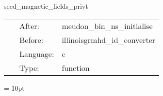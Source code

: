 
\hspace{5mm} seed\_magnetic\_fields\_privt 

\hspace{5mm}{\it set up binary neutron star seed magnetic fields. } 


\hspace{5mm}

 \begin{tabular*}{160mm}{cll} 
~ & After:  & meudon\_bin\_ns\_initialise \\ 
~ & Before:  & illinoisgrmhd\_id\_converter \\ 
~ & Language:  & c \\ 
~ & Type:  & function \\ 
\end{tabular*} 



\vspace{5mm}\parskip = 10pt 

